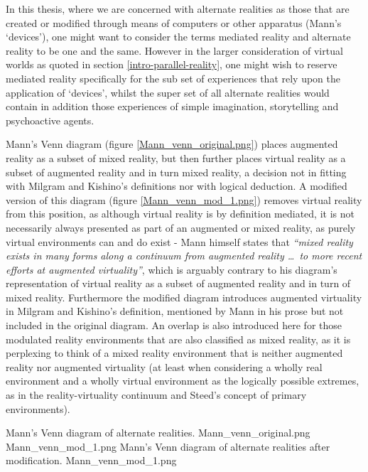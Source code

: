
In this thesis, where we are concerned with alternate realities as those that are created or modified through means of computers or other apparatus (Mann's `devices'), one might want to consider the terms mediated reality and alternate reality to be one and the same. However in the larger consideration of virtual worlds as quoted in section \ref{intro-parallel-reality}, one might wish to reserve mediated reality specifically for the sub set of experiences that rely upon the application of `devices', whilst the super set of all alternate realities would contain in addition those experiences of simple imagination, storytelling and psychoactive agents.

Mann's Venn diagram (figure \ref{Mann_venn_original.png}) places augmented reality as a subset of mixed reality, but then further places virtual reality as a subset of augmented reality and in turn mixed reality, a decision not in fitting with Milgram and Kishino's definitions nor with logical deduction. A modified version of this diagram (figure \ref{Mann_venn_mod_1.png}) removes virtual reality from this position, as although virtual reality is by definition mediated, it is not necessarily always presented as part of an augmented or mixed reality, as purely virtual environments can and do exist - Mann himself states that \textit{``mixed reality exists in many forms along a continuum from augmented reality \ldots\ to more recent efforts at augmented virtuality''}, which is arguably contrary to his diagram's representation of virtual reality as a subset of augmented reality and in turn of mixed reality. Furthermore the modified diagram introduces augmented virtuality in Milgram and Kishino's definition, mentioned by Mann in his prose but not included in the original diagram. An overlap is also introduced here for those modulated reality environments that are also classified as mixed reality, as it is perplexing to think of a mixed reality environment that is neither augmented reality nor augmented virtuality (at least when considering a wholly real environment and a wholly virtual environment as the logically possible extremes, as in the reality-virtuality continuum and Steed's concept of primary environments).

 {Mann's Venn diagram of alternate realities.} {Mann_venn_original.png}
       {Mann_venn_mod_1.png} {Mann's Venn diagram of alternate realities after modification.} {Mann_venn_mod_1.png}


